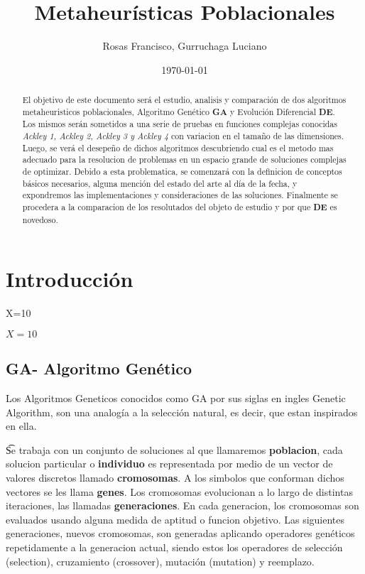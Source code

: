 \documentclass[10pt]{article}
\title{Metaheurísticas Poblacionales} %
\author{Rosas Francisco, Gurruchaga Luciano}
\date{\today} %
\begin{document}
\maketitle

\begin{abstract}

El objetivo de este documento será el estudio, analisis y comparación de dos algoritmos metaheuristicos poblacionales, Algoritmo Genético \textbf{GA} y Evolución Diferencial  \textbf{DE}. Los mismos serán sometidos a una serie de pruebas en funciones complejas conocidas  \textit{Ackley 1, Ackley 2, Ackley 3 y Ackley 4 }con variacion en el tamaño de las dimensiones. Luego, se verá el desepeño de dichos algoritmos descubriendo cual es el metodo mas adecuado para la resolucion de problemas en un espacio grande de soluciones complejas de optimizar. 
Debido a esta problematica, se comenzará con la definicion de conceptos básicos necesarios, alguna mención del estado del arte al día de la fecha, y expondremos las  implementaciones y consideraciones de las soluciones. Finalmente se procedera a la comparacion de los resolutados del objeto de estudio y por que  \textbf{DE} es novedoso.

\end{abstract}


\section{Introducción}

X=10

$X=10$

\subsection{\textbf{GA}- Algoritmo Genético }

Los Algoritmos Geneticos conocidos como GA por sus siglas en ingles Genetic Algorithm, son una analogía a la selección natural, es decir, que estan inspirados en ella.

\t Se trabaja con un conjunto de soluciones al que llamaremos \textbf{poblacion}, cada solucion particular o \textbf{individuo} es representada por medio de un vector de valores discretos llamado \textbf{cromosomas}. A los simbolos que conforman dichos vectores se les llama \textbf{genes}. Los cromosomas evolucionan a lo largo de distintas iteraciones, las llamadas \textbf{generaciones}. En cada generacion, los cromosomas son evaluados usando alguna medida de aptitud o funcion objetivo. Las siguientes generaciones, nuevos cromosomas, son generadas aplicando operadores genéticos repetidamente a la generacion actual, siendo estos los operadores de selección (selection), cruzamiento (crossover), mutación (mutation) y reemplazo.
\end{document}
